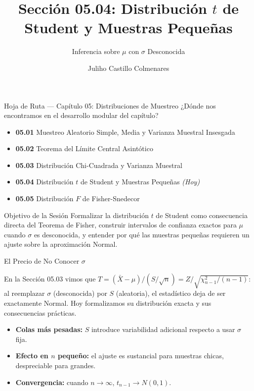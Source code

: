 \documentclass[10pt, aspectratio=169]{beamer}
\title[$t$ de Student]{Sección 05.04: Distribución $t$ de Student y Muestras Pequeñas}
\subtitle{Inferencia sobre $\mu$ con $\sigma$ Desconocida}
\author[J. Castillo Colmenares]{Juliho Castillo Colmenares}
\institute{Tecnológico de Monterrey}
\date{\vspace{-1.2cm}}
\begin{document}
\begin{frame}[plain]
  \vspace{-0.8cm}
  \titlepage
\end{frame}

\begin{frame}{Hoja de Ruta --- Capítulo 05: Distribuciones de Muestreo}
  \footnotesize
  ¿Dónde nos encontramos en el desarrollo modular del capítulo? \pause
  \begin{itemize}\itemsep=0.08em
    \item \textbf{05.01} Muestreo Aleatorio Simple, Media y Varianza Muestral Insesgada \pause
    \item \textbf{05.02} Teorema del Límite Central Asintótico \pause
    \item \textbf{05.03} Distribución Chi-Cuadrada y Varianza Muestral \pause
    \item \textbf{05.04} Distribución $t$ de Student y Muestras Pequeñas \emph{(Hoy)} \pause
    \item \textbf{05.05} Distribución $F$ de Fisher-Snedecor
  \end{itemize}
  \vspace{-0.05cm}
  \begin{block}{Objetivo de la Sesión}
    Formalizar la distribución $t$ de Student como consecuencia directa del Teorema de Fisher, construir intervalos de confianza exactos para $\mu$ cuando $\sigma$ es desconocida, y entender por qué las muestras pequeñas requieren un ajuste sobre la aproximación Normal.
  \end{block}
\end{frame}

\begin{frame}{El Precio de No Conocer $\sigma$}
  \footnotesize
  \begin{motivacion}
    En la Sección 05.03 vimos que $T=(\bar X-\mu)/(S/\sqrt n) = Z/\sqrt{\chi^2_{n-1}/(n-1)}$: al reemplazar $\sigma$ (desconocida) por $S$ (aleatoria), el estadístico deja de ser exactamente Normal. Hoy formalizamos su distribución exacta y sus consecuencias prácticas.
  \end{motivacion}

  \vspace{0.15cm}
  \pause
  \begin{itemize}\itemsep=0.1cm
    \item \textbf{Colas más pesadas:} $S$ introduce variabilidad adicional respecto a usar $\sigma$ fija. \pause
    \item \textbf{Efecto en $n$ pequeño:} el ajuste es sustancial para muestras chicas, despreciable para grandes. \pause
    \item \textbf{Convergencia:} cuando $n\to\infty$, $t_{n-1}\to N(0,1)$.
  \end{itemize}
\end{frame}
\end{document}
